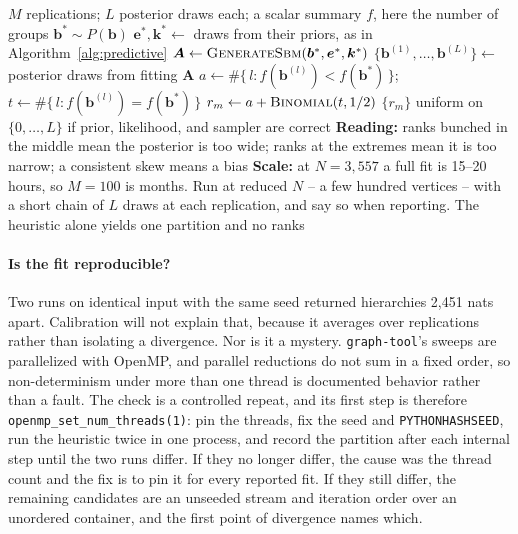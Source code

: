 \documentclass[11pt]{article}
\newcommand{\code}[1]{\texttt{\small #1}}
\begin{document}
\begin{algorithm}[!t]
\caption{Simulation-based calibration. Answers the first question only;
  reproducibility and consensus have their own checks. Language follows
  whichever implementation is being validated.}
\label{alg:sbc}
\begin{algorithmic}[1]
\Require $M$ replications; $L$ posterior draws each; a scalar summary $f$,
  here the number of groups
  \State $\bm{b}^{*} \sim P(\bm{b})$ 
  \State $\bm{e}^{*}, \bm{k}^{*} \gets$ draws from their priors, as in
    Algorithm~\ref{alg:predictive}
  \State $\bm{A} \gets \textsc{GenerateSbm}(\bm{b}^{*}, \bm{e}^{*},
    \bm{k}^{*})$
  \State $\{\bm{b}^{(1)}, \dots, \bm{b}^{(L)}\} \gets$ posterior draws from
    fitting $\bm{A}$
  \State $a \gets \#\{\, l : f(\bm{b}^{(l)}) < f(\bm{b}^{*}) \,\}$;\quad
    $t \gets \#\{\, l : f(\bm{b}^{(l)}) = f(\bm{b}^{*}) \,\}$
  \State $r_m \gets a + \textsc{Binomial}(t, 1/2)$
\EndFor
\Ensure $\{r_m\}$ uniform on $\{0, \dots, L\}$ if prior, likelihood, and
  sampler are correct
\State \textbf{Reading:} ranks bunched in the middle mean the posterior is too
  wide; ranks at the extremes mean it is too narrow; a consistent skew means a
  bias
\State \textbf{Scale:} at $N = 3{,}557$ a full fit is 15--20 hours, so
  $M = 100$ is months. Run at reduced $N$ -- a few hundred vertices -- with a
  short chain of $L$ draws at each replication, and say so when reporting.
  The heuristic alone yields one partition and no ranks
\end{algorithmic}
\end{algorithm}

\paragraph{Is the fit reproducible?} Two runs on identical input with the same
seed returned hierarchies 2{,}451 nats apart. Calibration will not explain
that, because it averages over replications rather than isolating a
divergence. Nor is it a mystery. \code{graph-tool}'s sweeps are parallelized with OpenMP,
and parallel reductions do not sum in a fixed order, so non-determinism under
more than one thread is documented behavior rather than a fault. The check is
a controlled repeat, and its first step is therefore
\code{openmp_set_num_threads(1)}: pin the threads, fix the seed and
\code{PYTHONHASHSEED}, run the heuristic twice in one process, and record the
partition after each internal step until the two runs differ. If they no
longer differ, the cause was the thread count and the fix is to pin it for
every reported fit. If they still differ, the remaining candidates are an
unseeded stream and iteration order over an unordered container, and the first
point of divergence names which.
\end{document}
